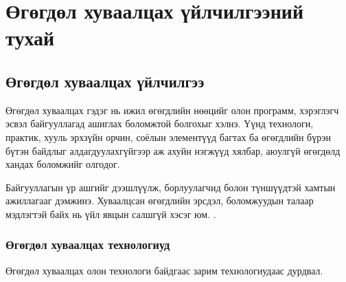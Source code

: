 
\chapter{Өгөгдөл хуваалцах үйлчилгээний тухай} %
\label{Chapter1} %
\pagecolor{white}

\newcommand{\keyword}[1]{\textbf{#1}}
\newcommand{\tabhead}[1]{\textbf{#1}}
\newcommand{\code}[1]{\texttt{#1}}
\newcommand{\file}[1]{\texttt{\bfseries#1}}
\newcommand{\option}[1]{\texttt{\itshape#1}}


\section{Өгөгдөл хуваалцах үйлчилгээ}
Өгөгдөл хуваалцах гэдэг нь ижил өгөгдлийн нөөцийг олон программ, хэрэглэгч эсвэл байгууллагад ашиглах боломжтой болгохыг хэлнэ.
Үүнд технологи, практик, хууль эрхзүйн орчин, соёлын элементүүд багтах ба өгөгдлийн бүрэн бүтэн байдлыг алдагдуулахгүйгээр аж ахуйн нэгжүүд хялбар, аюулгүй өгөгдөлд хандах боломжийг олгодог.

Байгууллагын үр ашгийг дээшлүүлж, борлуулагчид болон түншүүдтэй хамтын ажиллагааг дэмжинэ. Хуваалцсан өгөгдлийн эрсдэл, боломжуудын талаар мэдлэгтэй байх нь үйл явцын салшгүй хэсэг юм.
\cite{AWSDataSharing}.

\subsection{Өгөгдөл хуваалцах технологиуд}
Өгөгдөл хуваалцах олон технологи байдгаас зарим технологиудаас дурдвал.

